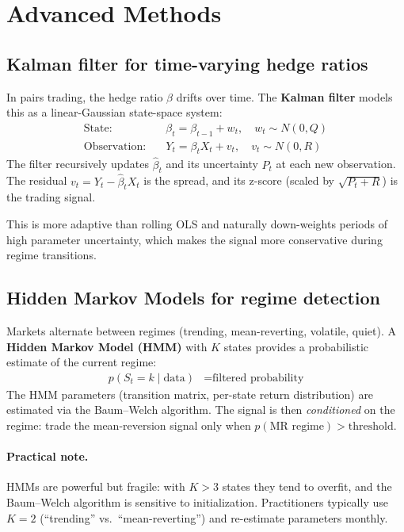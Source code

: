 \documentclass[11pt,a4paper]{article}
\begin{document}
\section{Advanced Methods}
\label{sec:advanced}

\subsection{Kalman filter for time-varying hedge ratios}

In pairs trading, the hedge ratio $\beta$ drifts over time. The
\textbf{Kalman filter} models this as a linear-Gaussian state-space
system:
\begin{align}
  \text{State:} \quad & \beta_t = \beta_{t-1} + w_t, \quad w_t \sim N(0, Q) \\
  \text{Observation:} \quad & Y_t = \beta_t X_t + v_t, \quad v_t \sim N(0, R)
\end{align}
The filter recursively updates $\hat\beta_t$ and its uncertainty
$P_t$ at each new observation. The residual $v_t = Y_t - \hat\beta_t
X_t$ is the spread, and its z-score (scaled by $\sqrt{P_t + R}$)
is the trading signal.

This is more adaptive than rolling OLS and naturally down-weights
periods of high parameter uncertainty, which makes the signal more
conservative during regime transitions.

\subsection{Hidden Markov Models for regime detection}

Markets alternate between regimes (trending, mean-reverting, volatile,
quiet). A \textbf{Hidden Markov Model (HMM)} with $K$ states provides
a probabilistic estimate of the current regime:
\begin{align}
  p(S_t = k \mid \text{data}) &= \text{filtered probability}
\end{align}
The HMM parameters (transition matrix, per-state return distribution)
are estimated via the Baum--Welch algorithm. The signal is then
\emph{conditioned} on the regime: trade the mean-reversion signal only
when $p(\text{MR regime}) > \text{threshold}$.

\paragraph{Practical note.}
HMMs are powerful but fragile: with $K > 3$ states they tend to
overfit, and the Baum--Welch algorithm is sensitive to initialization.
Practitioners typically use $K = 2$ (``trending'' vs.\ ``mean-reverting'')
and re-estimate parameters monthly.
\end{document}
